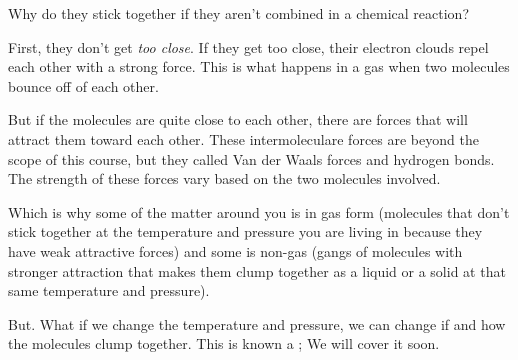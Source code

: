 Why do they stick together if they aren't combined in a chemical reaction?

First, they don't get \emph{too close}.  If they get too close,  their electron clouds repel each other with a strong force.  
This is what happens in a gas when two molecules bounce off of each other.

But if the molecules are quite close to each other,  there are forces that will attract them toward each other.  
These intermoleculare forces are beyond the scope of this course, but they called Van der Waals forces and hydrogen bonds.   
The strength of these forces vary based on the two molecules involved. 

Which is why some of the matter around you is in gas form (molecules that don't stick together at the temperature and pressure you are living in because they have weak attractive forces) and some is non-gas 
(gangs of molecules with stronger attraction that makes them clump together as a liquid or a solid at that same temperature and pressure).

But.  What if we change the temperature and pressure,  we can change if and how the molecules clump together.  
This is known a ; We will cover it soon.